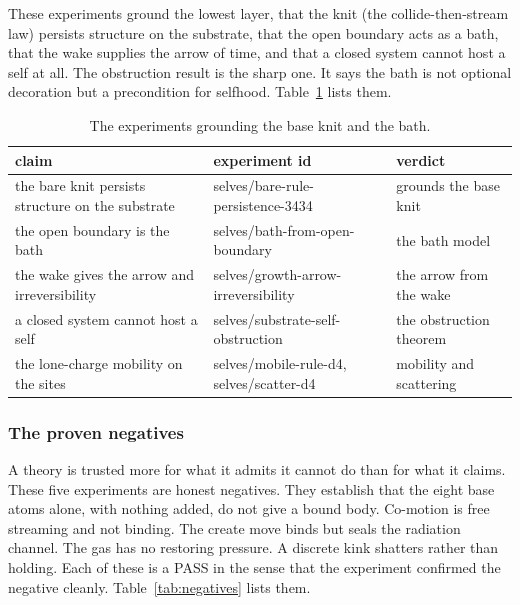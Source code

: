 These experiments ground the lowest layer, that the knit (the collide-then-stream law) persists structure on the substrate, that the open boundary acts as a bath, that the wake supplies the arrow of time, and that a closed system cannot host a self at all. The obstruction result is the sharp one. It says the bath is not optional decoration but a precondition for selfhood. Table~\ref{tab:base-knit} lists them.

\begin{table}[ht]
\centering
\begin{tabular}{@{}p{}p{}p{}@{}}
\toprule
claim & experiment id & verdict \\
\midrule
the bare knit persists structure on the substrate & selves/bare-rule-persistence-3434 & grounds the base knit \\
the open boundary is the bath & selves/bath-from-open-boundary & the bath model \\
the wake gives the arrow and irreversibility & selves/growth-arrow-irreversibility & the arrow from the wake \\
a closed system cannot host a self & selves/substrate-self-obstruction & the obstruction theorem \\
the lone-charge mobility on the sites & selves/mobile-rule-d4, selves/scatter-d4 & mobility and scattering \\
\bottomrule
\end{tabular}
\caption{The experiments grounding the base knit and the bath.}
\label{tab:base-knit}
\end{table}

\subsubsection{The proven negatives}

A theory is trusted more for what it admits it cannot do than for what it claims. These five experiments are honest negatives. They establish that the eight base atoms alone, with nothing added, do not give a bound body. Co-motion is free streaming and not binding. The create move binds but seals the radiation channel. The gas has no restoring pressure. A discrete kink shatters rather than holding. Each of these is a PASS in the sense that the experiment confirmed the negative cleanly. Table~\ref{tab:negatives} lists them.

